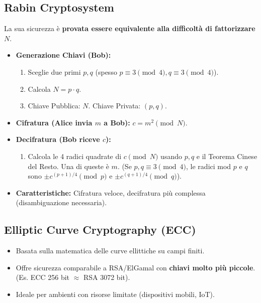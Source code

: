 \documentclass{article}
\begin{document}
\subsection{Rabin Cryptosystem}
La sua sicurezza è \textbf{provata essere equivalente alla difficoltà di fattorizzare $N$}.
\begin{itemize}
    \item \textbf{Generazione Chiavi (Bob):}
    \begin{enumerate}[label=\alph*)]
        \item Sceglie due primi $p, q$ (spesso $p \equiv 3 \pmod{4}, q \equiv 3 \pmod{4}$).
        \item Calcola $N = p \cdot q$.
        \item Chiave Pubblica: $N$. Chiave Privata: $(p, q)$.
    \end{enumerate}
    \item \textbf{Cifratura (Alice invia $m$ a Bob):}
    $c = m^2 \pmod{N}$.
    \item \textbf{Decifratura (Bob riceve $c$):}
    \begin{enumerate}[label=\alph*)]
        \item Calcola le 4 radici quadrate di $c \pmod{N}$ usando $p, q$ e il Teorema Cinese del Resto. Una di queste è $m$.
        (Se $p,q \equiv 3 \pmod 4$, le radici mod $p$ e $q$ sono $\pm c^{(p+1)/4} \pmod p$ e $\pm c^{(q+1)/4} \pmod q$).
    \end{enumerate}
    \item \textbf{Caratteristiche:} Cifratura veloce, decifratura più complessa (disambiguazione necessaria).
\end{itemize}

\subsection{Elliptic Curve Cryptography (ECC)}
\begin{itemize}
    \item Basata sulla matematica delle curve ellittiche su campi finiti.
    \item Offre sicurezza comparabile a RSA/ElGamal con \textbf{chiavi molto più piccole}.
    (Es. ECC 256 bit $\approx$ RSA 3072 bit).
    \item Ideale per ambienti con risorse limitate (dispositivi mobili, IoT).
\end{itemize}
\end{document}
